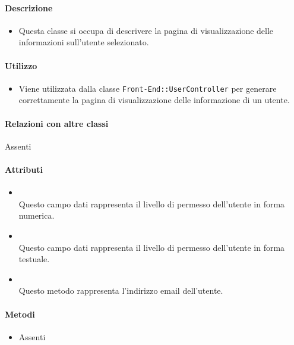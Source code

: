 \paragraph*{Descrizione}
\begin{itemize}
\item[] Questa classe si occupa di descrivere la pagina di visualizzazione delle informazioni sull'utente selezionato.
\end{itemize}

\paragraph*{Utilizzo}
\begin{itemize}
\item[] Viene utilizzata dalla classe \texttt{Front-End::UserController} per generare correttamente la pagina di visualizzazione delle informazione di un utente.
\end{itemize}

\paragraph*{Relazioni con altre classi}
Assenti

\paragraph*{Attributi}
\begin{itemize}
\item[]  \\ Questo campo dati rappresenta il livello di permesso dell'utente in forma numerica.
\item[]  \\ Questo campo dati rappresenta il livello di permesso dell'utente in forma testuale.
\item[]  \\ Questo metodo rappresenta l'indirizzo email dell'utente.
\end{itemize}

\paragraph*{Metodi}
\begin{itemize}
\item[] Assenti
\end{itemize}

